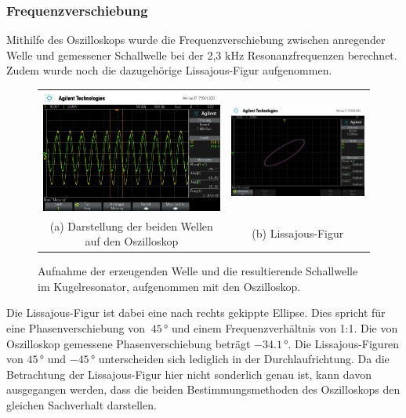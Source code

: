 \subsubsection{Frequenzverschiebung}

Mithilfe des Oszilloskops wurde die Frequenzverschiebung zwischen anregender Welle und gemessener Schallwelle bei der 2,3 kHz Resonanzfrequenzen berechnet. Zudem wurde noch die dazugehörige Lissajous-Figur aufgenommen.

\begin{figure}[H]
  \centering
  \begin{tabular}{cc}
  \includegraphics[width=65mm]{Daten/Oszilloskop/scope_2.png} &   \includegraphics[width=65mm]{Daten/Oszilloskop/scope_3.png} \\
  (a) Darstellung der beiden Wellen auf den Oszilloskop & (b) Lissajous-Figur  \\[6pt]
  \end{tabular}
  \caption{Aufnahme der erzeugenden Welle und die resultierende Schallwelle im Kugelresonator, aufgenommen mit den Oszilloskop.} 
  \label{fig:Phase_H}
\end{figure}

Die Lissajous-Figur ist dabei eine nach rechts gekippte Ellipse. Dies spricht für eine Phasenverschiebung von $~45\,°$ und einem Frequenzverhältnis von 1:1. Die von Oszilloskop gemessene Phasenverschiebung beträgt $-34.1\,°$. Die Lissajous-Figuren von $45\,°$ und $-45\,°$ unterscheiden sich lediglich in der Durchlaufrichtung. Da die Betrachtung der Lissajous-Figur hier nicht sonderlich genau ist, kann davon ausgegangen werden, dass die beiden Bestimmungsmethoden des Oszilloskops den gleichen Sachverhalt darstellen.

